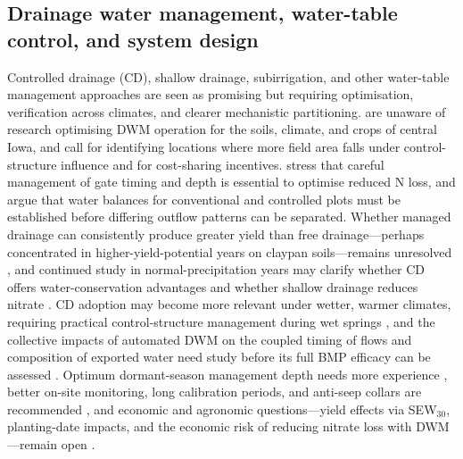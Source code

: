 \subsection{Drainage water management, water-table control, and system design}

Controlled drainage (CD), shallow drainage, subirrigation, and other water-table management approaches are seen as promising but requiring optimisation, verification across climates, and clearer mechanistic partitioning. \textcite{Jaynes2012} are unaware of research optimising DWM operation for the soils, climate, and crops of central Iowa, and call for identifying locations where more field area falls under control-structure influence and for cost-sharing incentives. \textcite{Fang2012} stress that careful management of gate timing and depth is essential to optimise reduced N loss, and \textcite{Wesström2001} argue that water balances for conventional and controlled plots must be established before differing outflow patterns can be separated. Whether managed drainage can consistently produce greater yield than free drainage---perhaps concentrated in higher-yield-potential years on claypan soils---remains unresolved \parencite{Nash2015,Nelson2011}, and continued study in normal-precipitation years may clarify whether CD offers water-conservation advantages and whether shallow drainage reduces nitrate \parencite{Smith2011b}. CD adoption may become more relevant under wetter, warmer climates, requiring practical control-structure management during wet springs \parencite{Madramootoo2024}, and the collective impacts of automated DWM on the coupled timing of flows and composition of exported water need study before its full BMP efficacy can be assessed \parencite{Miller2022}. Optimum dormant-season management depth needs more experience \parencite{Adeuya2012}, better on-site monitoring, long calibration periods, and anti-seep collars are recommended \parencite{Gunn2015}, and economic and agronomic questions---yield effects via SEW$_{30}$, planting-date impacts, and the economic risk of reducing nitrate loss with DWM---remain open \parencite{Schott2017b}.

